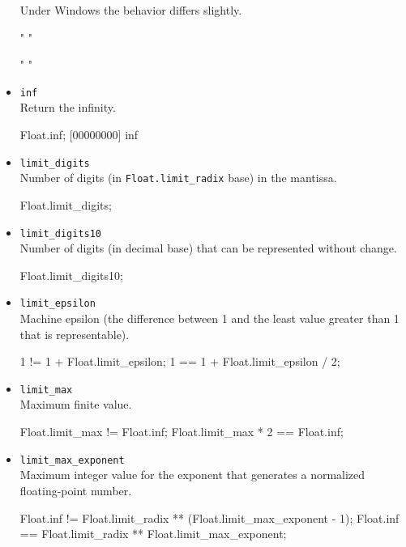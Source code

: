 \begin{itemize}
  \begin{windows}
    Under Windows the behavior differs slightly.
  \end{windows}
\begin{urbiassert}[firstnumber=last]
"%
"%

"%
"%
\end{urbiassert}

\item \lstinline|inf|\\
  Return the infinity.
\begin{urbiscript}[firstnumber=last]
Float.inf;
[00000000] inf
\end{urbiscript}

\item \lstinline|limit_digits|\\
  Number of digits (in \lstinline|Float.limit_radix| base) in the
  mantissa.
\begin{urbiassert}[firstnumber=last]
Float.limit_digits;
\end{urbiassert}

\item \lstinline|limit_digits10|\\
  Number of digits (in decimal base) that can be represented without
  change.
\begin{urbiassert}[firstnumber=last]
Float.limit_digits10;
\end{urbiassert}

\item \lstinline|limit_epsilon|\\
  Machine epsilon (the difference between 1 and the least value
  greater than 1 that is representable).
\begin{urbiassert}[firstnumber=last]
1 != 1 + Float.limit_epsilon;
1 == 1 + Float.limit_epsilon / 2;
\end{urbiassert}

\item \lstinline|limit_max|\\
  Maximum finite value.
\begin{urbiassert}[firstnumber=last]
Float.limit_max     != Float.inf;
Float.limit_max * 2 == Float.inf;
\end{urbiassert}

\item \lstinline|limit_max_exponent|\\
  Maximum integer value for the exponent that generates a normalized
  floating-point number.
\begin{urbiassert}[firstnumber=last]
Float.inf != Float.limit_radix ** (Float.limit_max_exponent - 1);
Float.inf == Float.limit_radix ** Float.limit_max_exponent;
\end{urbiassert}


\end{itemize}
